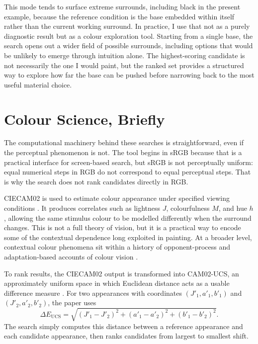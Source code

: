 \documentclass[11pt]{article}
\begin{document}
This mode tends to surface extreme surrounds, including black in the present example, because the reference condition is the base embedded within itself rather than the current working surround. In practice, I use that not as a purely diagnostic result but as a colour exploration tool. Starting from a single base, the search opens out a wider field of possible surrounds, including options that would be unlikely to emerge through intuition alone. The highest-scoring candidate is not necessarily the one I would paint, but the ranked set provides a structured way to explore how far the base can be pushed before narrowing back to the most useful material choice.

\section{Colour Science, Briefly}
The computational machinery behind these searches is straightforward, even if the perceptual phenomenon is not. The tool begins in sRGB because that is a practical interface for screen-based search, but sRGB is not perceptually uniform: equal numerical steps in RGB do not correspond to equal perceptual steps. That is why the search does not rank candidates directly in RGB.

CIECAM02 is used to estimate colour appearance under specified viewing conditions \parencite{CIECAM02,fairchild2013color}. It produces correlates such as lightness $J$, colourfulness $M$, and hue $h$, allowing the same stimulus colour to be modelled differently when the surround changes. This is not a full theory of vision, but it is a practical way to encode some of the contextual dependence long exploited in painting. At a broader level, contextual colour phenomena sit within a history of opponent-process and adaptation-based accounts of colour vision \parencite{HurvichJameson1957,Land1977}.

To rank results, the CIECAM02 output is transformed into CAM02-UCS, an approximately uniform space in which Euclidean distance acts as a usable difference measure \parencite{fairchild2013color}. For two appearances with coordinates $(J'_1, a'_1, b'_1)$ and $(J'_2, a'_2, b'_2)$, the paper uses
\begin{equation}
\Delta E_{\mathrm{UCS}} = \sqrt{(J'_1 - J'_2)^2 + (a'_1 - a'_2)^2 + (b'_1 - b'_2)^2}.
\end{equation}
The search simply computes this distance between a reference appearance and each candidate appearance, then ranks candidates from largest to smallest shift.
\end{document}

